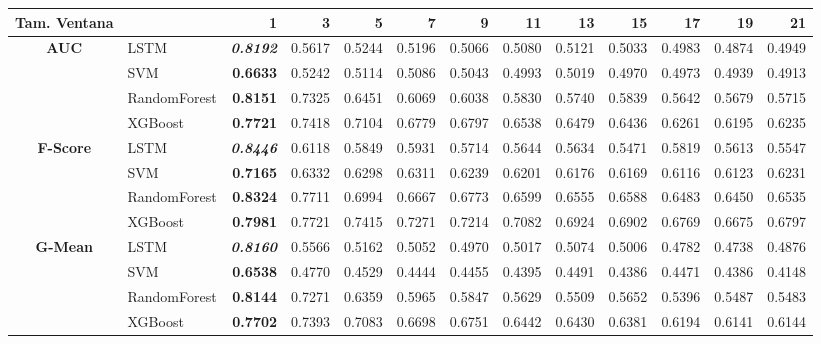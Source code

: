 \begin{table}[H]
	\centering
	\begin{adjustbox}{max width=14cm}
		\begin{tabular}{|c|l|r|r|r|r|r|r|r|r|r|r|r|}
			\hline
			\textbf{Tam. Ventana}&         &      1  &      3  &      5  &      7  &      9  &      11 &      13 &      15 &      17 &      19 &      21 \\
			\hline
			\textbf{AUC} &  LSTM & \textit{ \textbf{  0.8192 } } &  0.5617 &  0.5244 &  0.5196 &  0.5066 &  0.5080 &  0.5121 &  0.5033 &  0.4983 &  0.4874 &  0.4949 \\
			&  SVM & \textbf{  0.6633 } &  0.5242 &  0.5114 &  0.5086 &  0.5043 &  0.4993 &  0.5019 &  0.4970 &  0.4973 &  0.4939 &  0.4913 \\
			&  RandomForest & \textbf{  0.8151 } &  0.7325 &  0.6451 &  0.6069 &  0.6038 &  0.5830 &  0.5740 &  0.5839 &  0.5642 &  0.5679 &  0.5715 \\
			&  XGBoost & \textbf{  0.7721 } &  0.7418 &  0.7104 &  0.6779 &  0.6797 &  0.6538 &  0.6479 &  0.6436 &  0.6261 &  0.6195 &  0.6235 \\
			\hline
			\textbf{F-Score} &  LSTM & \textit{ \textbf{  0.8446 } } &  0.6118 &  0.5849 &  0.5931 &  0.5714 &  0.5644 &  0.5634 &  0.5471 &  0.5819 &  0.5613 &  0.5547 \\
			&  SVM & \textbf{  0.7165 } &  0.6332 &  0.6298 &  0.6311 &  0.6239 &  0.6201 &  0.6176 &  0.6169 &  0.6116 &  0.6123 &  0.6231 \\
			&  RandomForest & \textbf{  0.8324 } &  0.7711 &  0.6994 &  0.6667 &  0.6773 &  0.6599 &  0.6555 &  0.6588 &  0.6483 &  0.6450 &  0.6535 \\
			&  XGBoost & \textbf{  0.7981 } &  0.7721 &  0.7415 &  0.7271 &  0.7214 &  0.7082 &  0.6924 &  0.6902 &  0.6769 &  0.6675 &  0.6797 \\
			\hline
			\textbf{G-Mean} &  LSTM & \textit{ \textbf{  0.8160 } } &  0.5566 &  0.5162 &  0.5052 &  0.4970 &  0.5017 &  0.5074 &  0.5006 &  0.4782 &  0.4738 &  0.4876 \\
			&  SVM & \textbf{  0.6538 } &  0.4770 &  0.4529 &  0.4444 &  0.4455 &  0.4395 &  0.4491 &  0.4386 &  0.4471 &  0.4386 &  0.4148 \\
			&  RandomForest & \textbf{  0.8144 } &  0.7271 &  0.6359 &  0.5965 &  0.5847 &  0.5629 &  0.5509 &  0.5652 &  0.5396 &  0.5487 &  0.5483 \\
			&  XGBoost & \textbf{  0.7702 } &  0.7393 &  0.7083 &  0.6698 &  0.6751 &  0.6442 &  0.6430 &  0.6381 &  0.6194 &  0.6141 &  0.6144 \\

\end{tabular}
\end{adjustbox}
\end{table}
